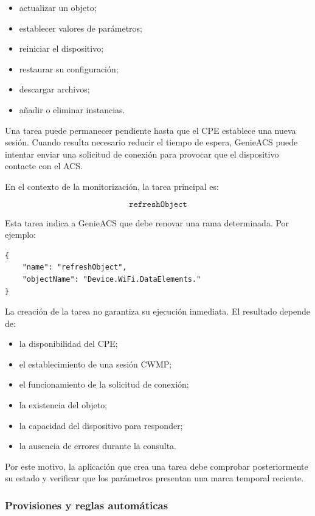 \begin{itemize}
    \item actualizar un objeto;
    \item establecer valores de parámetros;
    \item reiniciar el dispositivo;
    \item restaurar su configuración;
    \item descargar archivos;
    \item añadir o eliminar instancias.
\end{itemize}

Una tarea puede permanecer pendiente hasta que el CPE establece una nueva
sesión. Cuando resulta necesario reducir el tiempo de espera, GenieACS
puede intentar enviar una solicitud de conexión para provocar que el
dispositivo contacte con el ACS.

En el contexto de la monitorización, la tarea principal es:

\[
    \texttt{refreshObject}
\]

Esta tarea indica a GenieACS que debe renovar una rama determinada. Por
ejemplo:

\begin{verbatim}
{
    "name": "refreshObject",
    "objectName": "Device.WiFi.DataElements."
}
\end{verbatim}

La creación de la tarea no garantiza su ejecución inmediata. El resultado
depende de:

\begin{itemize}
    \item la disponibilidad del CPE;
    \item el establecimiento de una sesión CWMP;
    \item el funcionamiento de la solicitud de conexión;
    \item la existencia del objeto;
    \item la capacidad del dispositivo para responder;
    \item la ausencia de errores durante la consulta.
\end{itemize}

Por este motivo, la aplicación que crea una tarea debe comprobar
posteriormente su estado y verificar que los parámetros presentan una
marca temporal reciente.


\subsubsection*{Provisiones y reglas automáticas}

